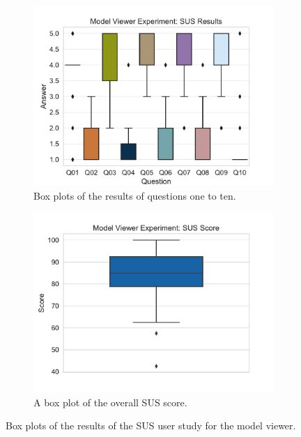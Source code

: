 \begin{figure}[H]
	\centering
	\begin{subfigure}[t]{.48\linewidth}%
		\centering
		\includegraphics[width=\linewidth]{figures/evaluation/res_exp_mv.pdf}
		\caption{Box plots of the results of questions one to ten.}\label{fig:res-exp-mv}
	\end{subfigure}%
	\hspace{0.03\linewidth}%
	\begin{subfigure}[t]{.48\linewidth}%
		\centering
		\includegraphics[width=\linewidth]{figures/evaluation/score_exp_mv.pdf}
		\caption{A box plot of the overall \gls{SUS} score.}\label{fig:score-exp-mv}
	\end{subfigure}%
	\caption[Model viewer SUS results]{Box plots of the results of the \gls{SUS} user study for the model viewer.}\label{fig:exp-mv-stats}
\end{figure}

